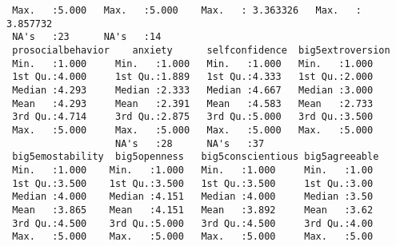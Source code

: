 \begin{verbatim}
 Max.   :5.000   Max.   :5.000    Max.   : 3.363326   Max.   : 3.857732  
 NA's   :23      NA's   :14                                              
 prosocialbehavior    anxiety      selfconfidence  big5extroversion
 Min.   :1.000     Min.   :1.000   Min.   :1.000   Min.   :1.000   
 1st Qu.:4.000     1st Qu.:1.889   1st Qu.:4.333   1st Qu.:2.000   
 Median :4.293     Median :2.333   Median :4.667   Median :3.000   
 Mean   :4.293     Mean   :2.391   Mean   :4.583   Mean   :2.733   
 3rd Qu.:4.714     3rd Qu.:2.875   3rd Qu.:5.000   3rd Qu.:3.500   
 Max.   :5.000     Max.   :5.000   Max.   :5.000   Max.   :5.000   
                   NA's   :28      NA's   :37                      
 big5emostability  big5openness   big5conscientious big5agreeable 
 Min.   :1.000    Min.   :1.000   Min.   :1.000     Min.   :1.00  
 1st Qu.:3.500    1st Qu.:3.500   1st Qu.:3.500     1st Qu.:3.00  
 Median :4.000    Median :4.151   Median :4.000     Median :3.50  
 Mean   :3.865    Mean   :4.151   Mean   :3.892     Mean   :3.62  
 3rd Qu.:4.500    3rd Qu.:5.000   3rd Qu.:4.500     3rd Qu.:4.00  
 Max.   :5.000    Max.   :5.000   Max.   :5.000     Max.   :5.00  
                                                                  

\end{verbatim}
